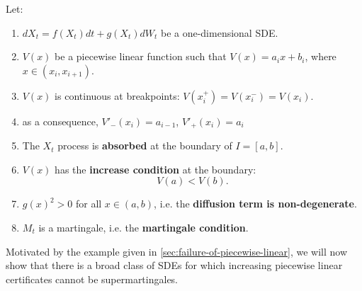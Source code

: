\begin{setup}
Let:
    \begin{enumerate}
        \item $dX_t = f(X_t)dt + g(X_t)dW_t$ be a one-dimensional SDE.
        \item $V(x)$ be a piecewise linear function such that
        $V(x)=a_i x+b_i$, where $x\in(x_i,x_{i+1})$.
        \item $V(x)$ is continuous at breakpoints:
        $V(x_i^+)=V(x_i^-)=V(x_i)$.
        \item as a consequence, $V'_{-}(x_i) = a_{i-1}$, $V'_{+}(x_i) = a_i$
        \item The $X_t$ process is \textbf{absorbed} at the boundary of
        $I=[a,b]$.
        \item $V(x)$ has the \textbf{increase condition} at the boundary:
        \begin{equation}
        V(a)<V(b).
        \end{equation}
        \item $g(x)^2>0$ for all $x\in(a,b)$, i.e. the \textbf{diffusion term is
        non-degenerate}.
        \item $M_t$ is a martingale, i.e. the \textbf{martingale condition}.
        \end{enumerate}
\end{setup}

Motivated by the example given in \autoref{sec:failure-of-piecewise-linear},
we will now show that there is a broad class of SDEs for which increasing
piecewise linear certificates cannot be supermartingales.

